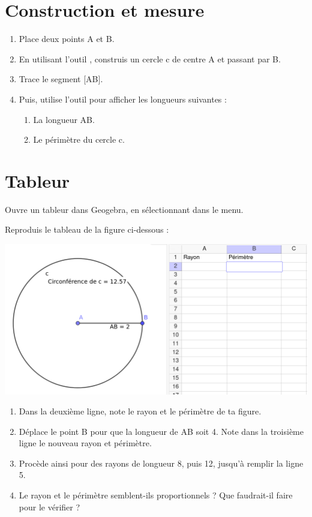 \documentclass[a4paper,10pt]{article}
\begin{document}
\maketitle

\section{Construction et mesure}
\begin{enumerate}
	\item Place deux points A et B.
	\item En utilisant l'outil , construis un cercle c de centre A et passant par B.
	\item Trace le segment [AB].
	\item Puis, utilise l'outil  pour afficher les longueurs suivantes :
	      \begin{enumerate}
		      \item La longueur AB.
		      \item Le périmètre du cercle c.
	      \end{enumerate}
\end{enumerate}


\section{Tableur}
Ouvre un tableur dans Geogebra, en sélectionnant  dans le menu.

Reproduis le tableau de la figure ci-dessous :

\begin{center}
	\includegraphics[width=0.7\linewidth]{Images/Geogebra - figure pi.png}
\end{center}

\begin{enumerate}
	\item Dans la deuxième ligne, note le rayon et le périmètre de ta figure.
	\item Déplace le point B pour que la longueur de AB soit 4. Note dans la troisième ligne le nouveau rayon et périmètre.
	\item Procède ainsi pour des rayons de longueur 8, puis 12, jusqu'à remplir la ligne 5.
	\item Le rayon et le périmètre semblent-ils proportionnels ? Que faudrait-il faire pour le vérifier ?
\end{enumerate}
\end{document}
